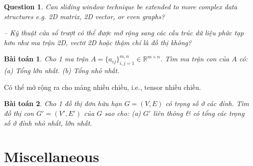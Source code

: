 \documentclass{article}
\newtheorem{baitoan}{Bài toán}
\newtheorem{question}{Question}
\begin{document}
\begin{question}
    Can sliding window technique be extended to more complex data structures e.g. 2D matrix, 2D vector, or even graphs?

    -- Kỹ thuật cửa sổ trượt có thể được mở rộng sang các cấu trúc dữ liệu phức tạp hơn như ma trận 2D, vectơ 2D hoặc thậm chí là đồ thị không?
\end{question}


\begin{baitoan}
    Cho 1 ma trận $A = \{a_{ij}\}_{i,j=1}^{m,n}\in\mathbb{R}^{m\times n}$. Tìm ma trận con của $A$ có: (a) Tổng lớn nhất. (b) Tổng nhỏ nhất.
\end{baitoan}
Có thể mở rộng ra cho mảng nhiều chiều, i.e., tensor nhiều chiều.

\begin{baitoan}
    Cho 1 đồ thị đơn hữu hạn $G = (V,E)$ có trọng số ở các đỉnh. Tìm đồ thị con $G' = (V',E')$ của $G$ sao cho: (a) $G'$ liên thông \& có tổng các trọng số ở đỉnh nhỏ nhất, lớn nhất.
\end{baitoan}


\section{Miscellaneous}


\printbibliography[heading=bibintoc]
\end{document}
